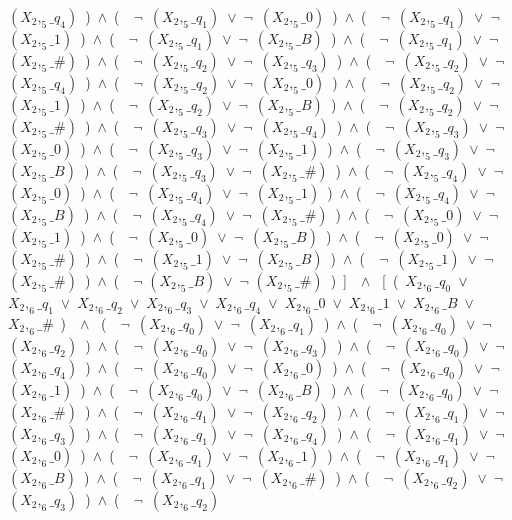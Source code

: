 ﻿\documentclass[a4paper,10pt]{article}
\begin{document}
$(X_2,_5\_q_4)$\ )\ $\wedge$\ (\ \ $\neg$\ $(X_2,_5\_q_1)$\ $\vee$\ $\neg$\ $(X_2,_5\_0)$\ )\ $\wedge$\ (\ \ $\neg$\ $(X_2,_5\_q_1)$\ $\vee$\ $\neg$\ $(X_2,_5\_1)$\ )\ $\wedge$\ (\ \ $\neg$\ $(X_2,_5\_q_1)$\ $\vee$\ $\neg$\ $(X_2,_5\_B)$\ )\ $\wedge$\ (\ \ $\neg$\ $(X_2,_5\_q_1)$\ $\vee$\ $\neg$\ $(X_2,_5\_\#)$\ )\ $\wedge$\ (\ \ $\neg$\ $(X_2,_5\_q_2)$\ $\vee$\ $\neg$\ $(X_2,_5\_q_3)$\ )\ $\wedge$\ (\ \ $\neg$\ $(X_2,_5\_q_2)$\ $\vee$\ $\neg$\ $(X_2,_5\_q_4)$\ )\ $\wedge$\ (\ \ $\neg$\ $(X_2,_5\_q_2)$\ $\vee$\ $\neg$\ $(X_2,_5\_0)$\ )\ $\wedge$\ (\ \ $\neg$\ $(X_2,_5\_q_2)$\ $\vee$\ $\neg$\ $(X_2,_5\_1)$\ )\ $\wedge$\ (\ \ $\neg$\ $(X_2,_5\_q_2)$\ $\vee$\ $\neg$\ $(X_2,_5\_B)$\ )\ $\wedge$\ (\ \ $\neg$\ $(X_2,_5\_q_2)$\ $\vee$\ $\neg$\ $(X_2,_5\_\#)$\ )\ $\wedge$\ (\ \ $\neg$\ $(X_2,_5\_q_3)$\ $\vee$\ $\neg$\ $(X_2,_5\_q_4)$\ )\ $\wedge$\ (\ \ $\neg$\ $(X_2,_5\_q_3)$\ $\vee$\ $\neg$\ $(X_2,_5\_0)$\ )\ $\wedge$\ (\ \ $\neg$\ $(X_2,_5\_q_3)$\ $\vee$\ $\neg$\ $(X_2,_5\_1)$\ )\ $\wedge$\ (\ \ $\neg$\ $(X_2,_5\_q_3)$\ $\vee$\ $\neg$\ $(X_2,_5\_B)$\ )\ $\wedge$\ (\ \ $\neg$\ $(X_2,_5\_q_3)$\ $\vee$\ $\neg$\ $(X_2,_5\_\#)$\ )\ $\wedge$\ (\ \ $\neg$\ $(X_2,_5\_q_4)$\ $\vee$\ $\neg$\ $(X_2,_5\_0)$\ )\ $\wedge$\ (\ \ $\neg$\ $(X_2,_5\_q_4)$\ $\vee$\ $\neg$\ $(X_2,_5\_1)$\ )\ $\wedge$\ (\ \ $\neg$\ $(X_2,_5\_q_4)$\ $\vee$\ $\neg$\ $(X_2,_5\_B)$\ )\ $\wedge$\ (\ \ $\neg$\ $(X_2,_5\_q_4)$\ $\vee$\ $\neg$\ $(X_2,_5\_\#)$\ )\ $\wedge$\ (\ \ $\neg$\ $(X_2,_5\_0)$\ $\vee$\ $\neg$\ $(X_2,_5\_1)$\ )\ $\wedge$\ (\ \ $\neg$\ $(X_2,_5\_0)$\ $\vee$\ $\neg$\ $(X_2,_5\_B)$\ )\ $\wedge$\ (\ \ $\neg$\ $(X_2,_5\_0)$\ $\vee$\ $\neg$\ $(X_2,_5\_\#)$\ )\ $\wedge$\ (\ \ $\neg$\ $(X_2,_5\_1)$\ $\vee$\ $\neg$\ $(X_2,_5\_B)$\ )\ $\wedge$\ (\ \ $\neg$\ $(X_2,_5\_1)$\ $\vee$\ $\neg$\ $(X_2,_5\_\#)$\ )\ $\wedge$\ (\ \ $\neg$ $(X_2,_5\_B)$\ $\vee$\ $\neg$ $(X_2,_5\_\#)$\ )\ ]\ \ $\wedge$ \ [\ (\ $X_2,_6\_q_0$\ $\vee$\ $X_2,_6\_q_1$\ $\vee$\ $X_2,_6\_q_2$\ $\vee$\ $X_2,_6\_q_3$\ $\vee$\ $X_2,_6\_q_4$\ $\vee$\ $X_2,_6\_0$\ $\vee$\ $X_2,_6\_1$\ $\vee$\ $X_2,_6\_B$\ $\vee$\ $X_2,_6\_\#$\ )\ \ $\wedge$ \ (\ \ $\neg$\ $(X_2,_6\_q_0)$\ $\vee$\ $\neg$\ $(X_2,_6\_q_1)$\ )\ $\wedge$\ (\ \ $\neg$\ $(X_2,_6\_q_0)$\ $\vee$\ $\neg$\ $(X_2,_6\_q_2)$\ )\ $\wedge$\ (\ \ $\neg$\ $(X_2,_6\_q_0)$\ $\vee$\ $\neg$\ $(X_2,_6\_q_3)$\ )\ $\wedge$\ (\ \ $\neg$\ $(X_2,_6\_q_0)$\ $\vee$\ $\neg$\ $(X_2,_6\_q_4)$\ )\ $\wedge$\ (\ \ $\neg$\ $(X_2,_6\_q_0)$\ $\vee$\ $\neg$\ $(X_2,_6\_0)$\ )\ $\wedge$\ (\ \ $\neg$\ $(X_2,_6\_q_0)$\ $\vee$\ $\neg$\ $(X_2,_6\_1)$\ )\ $\wedge$\ (\ \ $\neg$\ $(X_2,_6\_q_0)$\ $\vee$\ $\neg$\ $(X_2,_6\_B)$\ )\ $\wedge$\ (\ \ $\neg$\ $(X_2,_6\_q_0)$\ $\vee$\ $\neg$\ $(X_2,_6\_\#)$\ )\ $\wedge$\ (\ \ $\neg$\ $(X_2,_6\_q_1)$\ $\vee$\ $\neg$\ $(X_2,_6\_q_2)$\ )\ $\wedge$\ (\ \ $\neg$\ $(X_2,_6\_q_1)$\ $\vee$\ $\neg$\ $(X_2,_6\_q_3)$\ )\ $\wedge$\ (\ \ $\neg$\ $(X_2,_6\_q_1)$\ $\vee$\ $\neg$\ $(X_2,_6\_q_4)$\ )\ $\wedge$\ (\ \ $\neg$\ $(X_2,_6\_q_1)$\ $\vee$\ $\neg$\ $(X_2,_6\_0)$\ )\ $\wedge$\ (\ \ $\neg$\ $(X_2,_6\_q_1)$\ $\vee$\ $\neg$\ $(X_2,_6\_1)$\ )\ $\wedge$\ (\ \ $\neg$\ $(X_2,_6\_q_1)$\ $\vee$\ $\neg$\ $(X_2,_6\_B)$\ )\ $\wedge$\ (\ \ $\neg$\ $(X_2,_6\_q_1)$\ $\vee$\ $\neg$\ $(X_2,_6\_\#)$\ )\ $\wedge$\ (\ \ $\neg$\ $(X_2,_6\_q_2)$\ $\vee$\ $\neg$\ $(X_2,_6\_q_3)$\ )\ $\wedge$\ (\ \ $\neg$\ $(X_2,_6\_q_2)$\ 
\end{document}
